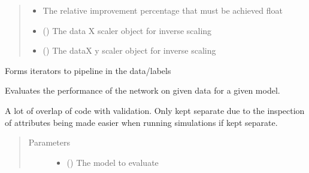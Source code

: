 \documentclass[letterpaper,10pt,english]{sphinxmanual}
\begin{document}
\begin{fulllineitems}
\begin{quote}
\begin{description}
\begin{itemize}
\item {} 
 \textendash{} The relative improvement percentage that must be
achieved float

\item {} 
 () \textendash{} The data X scaler object for inverse scaling

\item {} 
 () \textendash{} The dataX y scaler object for inverse scaling

\end{itemize}

\end{description}\end{quote}

\begin{fulllineitems}
\label{\detokenize{deeplearning:Foresight.deeplearning.DeepLearning.create_data_loaders}}
Forms iterators to pipeline in the data/labels

\end{fulllineitems}


\begin{fulllineitems}
\label{\detokenize{deeplearning:Foresight.deeplearning.DeepLearning.evaluate}}
Evaluates the performance of the network on given data for a given
model.

A lot of overlap of code with validation. Only kept separate due to the
inspection of attributes being made easier when running simulations
if kept separate.
\begin{quote}\begin{description}
\item[{Parameters}] \leavevmode\begin{itemize}
\item {} 
 () \textendash{} The model to evaluate


\end{itemize}
\end{description}
\end{quote}
\end{fulllineitems}
\end{fulllineitems}
\end{document}
